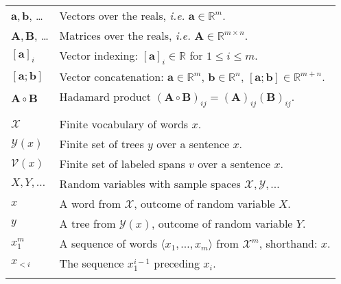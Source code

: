 %
% 

\begin{table}[h]
\center

  \begin{tabular}{ll}

    $\mathbf{a}, \mathbf{b}$, \dots  & Vectors over the reals, \textit{i.e.} $\mathbf{a} \in \mathbb{R}^m$.  \\
    $\mathbf{A}, \mathbf{B}$, \dots & Matrices over the reals, \textit{i.e.} $\mathbf{A} \in \mathbb{R}^{m \times n}$.   \\
    $[\mathbf{a}]_i$ & Vector indexing: $[\mathbf{a}]_i \in \mathbb{R}$ for $1 \leq i \leq m$. \\
    $[\mathbf{a}; \mathbf{b}]$ & Vector concatenation: $\mathbf{a} \in \mathbb{R}^{m}$, $\mathbf{b} \in \mathbb{R}^{n}$, $[\mathbf{a}; \mathbf{b}] \in \mathbb{R}^{m+n}$.  \\
    $\mathbf{A} \circ \mathbf{B}$ & Hadamard product $(\mathbf{A} \circ \mathbf{B})_{ij} = (\mathbf{A})_{ij}(\mathbf{B})_{ij}$. \\
    & \\

    $\mathcal{X}$ & Finite vocabulary of words $x$. \\
    $\mathcal{Y}(x)$ & Finite set of trees $y$ over a sentence $x$.  \\
    $\mathcal{V}(x)$ & Finite set of labeled spans $v$ over a sentence $x$.  \\
    $X, Y, \dots$ & Random variables with sample spaces $\mathcal{X}, \mathcal{Y}, \dots$  \\
    $x$ & A word from $\mathcal{X}$, outcome of random variable $X$.   \\
    $y$ & A tree from $\mathcal{Y}(x)$, outcome of random variable $Y$.  \\
    $x_1^m$ & A sequence of words $\langle x_1, \dots, x_m \rangle$ from $\mathcal{X}^m$, shorthand: $x$. \\
    $x_{<i}$ & The sequence $x_{1}^{i-1}$ preceding $x_i$.  \\
    & \\


\end{tabular}
\end{table}
